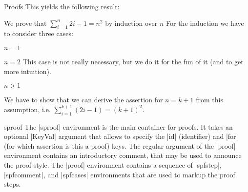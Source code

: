 \begin{sfragment}{Proofs}
This yields the following result: 

\begin{mdframed}
  \begin{sproof}[id=simple-proof,method=induction]
    {We prove that $\sum_{i=1}^n{2i-1}=n^{2}$ by induction over $n$}
   For the induction we have to consider three cases:
    \begin{subproof}{$n=1$}
    \end{subproof}
    \begin{subproof}{$n=2$}
         This case is not really necessary, but we do it for the
         fun of it (and to get more intuition).
    \end{subproof}
    \begin{subproof}{$n>1$}\begin{spfblock}
       
         We have to show that we can derive the assertion for $n=k+1$ from
         this assumption, i.e. $\sum_{i=1}^{k+1}{(2i-1)}=(k+1)^{2}$.
 
    \end{spfblock}\end{subproof}
 \end{sproof}
\end{mdframed}

\begin{environment}{sproof}
  The |sproof| environment is the main container for proofs. It takes an optional |KeyVal|
  argument that allows to specify the |id| (identifier) and |for| (for which assertion is
  this a proof) keys. The regular argument of the |proof| environment contains an
  introductory comment, that may be used to announce the proof style. The |proof|
  environment contains a sequence of |spfstep|, |spfcomment|, and |spfcases| environments
  that are used to markup the proof steps.
\end{environment}
  

\end{sfragment}
